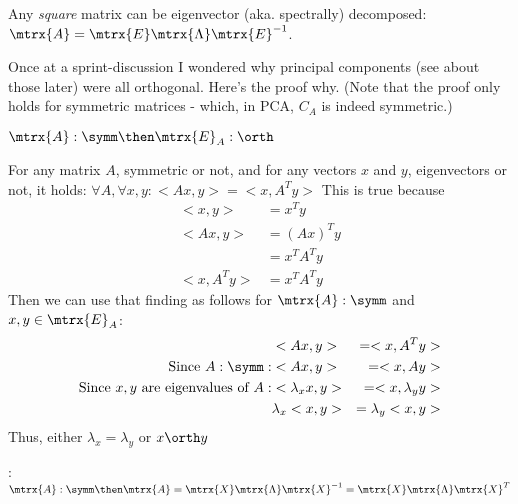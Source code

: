 Any \emph{square} matrix can be eigenvector (aka. spectrally) decomposed: $\mtrx{A} = \mtrx{E} \mtrx{\Lambda}\mtrx{E}^{-1}$.



Once at a sprint-discussion I wondered why principal components (see about those later) were all orthogonal. Here's the proof why. (Note that the proof only holds for symmetric matrices - which, in PCA, $C_A$ is indeed symmetric.)
\begin{theorem} \label{symm_then_orth}
    $\mtrx{A}: \symm \then \mtrx{E}_A: \orth$

    For any matrix $A$, symmetric or not, and for any vectors $x$ and $y$, eigenvectors or not, it holds:
    $\forall A, \forall x, y: <Ax, y> = <x, A^Ty>$
    This is true because 
    \begin{equation}
        \begin{aligned}
            <x, y>      &= x^T y \\
            <Ax, y>     &= (Ax)^T y \\
                        &= x^T A^T y \\
            <x, A^Ty>   &= x^T A^T y
        \end{aligned}
    \end{equation}
    Then we can use that finding as follows for $\mtrx{A}: \symm$ and $x, y \in \mtrx{E}_A$:
    \begin{equation}
        \begin{aligned}
                                                                & <Ax, y>           &= <x, A^Ty> \\
            \text{Since } A:\symm:                              & <Ax, y>           &= <x, Ay> \\
            \text{Since } x, y \text{ are eigenvalues of } A:   & <\lambda_x x, y>  &= <x, \lambda_y y> \\
                                                                & \lambda_x <x, y>  &= \lambda_y <x, y>
        \end{aligned}
    \end{equation}
    Thus, either $\lambda_x = \lambda_y$ or $x \orth y$ 
\end{theorem}

\begin{theorem}
    : $\mtrx{A}: \symm \then \mtrx{A} = \mtrx{X} \mtrx{\Lambda} \mtrx{X}^{-1} = \mtrx{X} \mtrx{\Lambda} \mtrx{X}^T$
\end{theorem}

